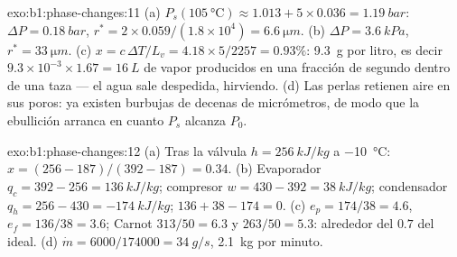 \begin{solution}{exo:b1:phase-changes:11}
(a) $P_s(\qty{105}{\degreeCelsius}) \approx 1.013 + 5 \times 0.036 = \qty{1.19}{bar}$:
$\Delta P = \qty{0.18}{bar}$, $r^\ast = 2 \times 0.059/(1.8 \times 10^4) = \qty{6.6}{\micro m}$.
(b) $\Delta P = \qty{3.6}{kPa}$, $r^\ast = \qty{33}{\micro m}$. (c) $x = c\,\Delta T/L_v =
4.18 \times 5/2257 = 0.93\%$: \qty{9.3}{g} por litro, es decir $9.3 \times 10^{-3}
\times 1.67 = \qty{16}{L}$ de vapor producidos en una fracción de segundo dentro
de una taza --- el agua sale despedida, hirviendo. (d) Las perlas retienen
aire en sus poros: ya existen burbujas de decenas de micrómetros, de modo
que la ebullición arranca en cuanto $P_s$ alcanza $P_0$.
\end{solution}

\begin{solution}{exo:b1:phase-changes:12}
(a) Tras la válvula $h = \qty{256}{kJ/kg}$ a \qty{-10}{\degreeCelsius}: $x =
(256 - 187)/(392 - 187) = 0.34$. (b) Evaporador $q_c = 392 - 256 =
\qty{136}{kJ/kg}$; compresor $w = 430 - 392 = \qty{38}{kJ/kg}$; condensador
$q_h = 256 - 430 = \qty{-174}{kJ/kg}$; $136 + 38 - 174 = 0$. (c) $e_p =
174/38 = 4.6$, $e_f = 136/38 = 3.6$; Carnot $313/50 = 6.3$ y $263/50 =
5.3$: alrededor del $0.7$ del ideal. (d) $\dot m = 6000/174000 = \qty{34}{g/s}$,
\qty{2.1}{kg} por minuto.
\end{solution}

